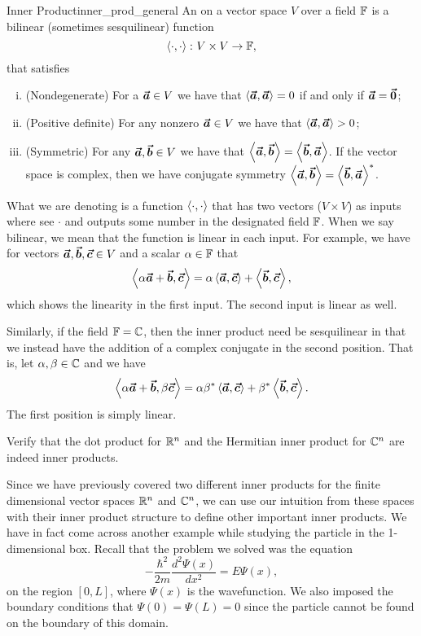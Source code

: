 \begin{df}{Inner Product}{inner_prod_general}
An  on a vector space $V$ over a field $\mathbb{F}$ is a bilinear (sometimes sesquilinear) function
\[
\left\langle \cdot, \cdot \right\rangle \colon V \times V \to \mathbb{F},
\]
that satisfies
\begin{enumerate}[i.]
	\item (Nondegenerate) For a $\boldsymbol{\vec{a}}\in V$ we have that $\left\langle \boldsymbol{\vec{a}}, \boldsymbol{\vec{a}} \right\rangle =0$ if and only if $\boldsymbol{\vec{a}}=\boldsymbol{\vec{0}}$;
	\item (Positive definite) For any nonzero $\boldsymbol{\vec{a}} \in V$ we have that $\left\langle \boldsymbol{\vec{a}}, \boldsymbol{\vec{a}} \right\rangle > 0$;
	\item (Symmetric) For any $\boldsymbol{\vec{a}},\boldsymbol{\vec{b}}\in V$ we have that $\left\langle \boldsymbol{\vec{a}}, \boldsymbol{\vec{b}} \right\rangle = \left\langle \boldsymbol{\vec{b}}, \boldsymbol{\vec{a}} \right\rangle$. If the vector space is complex, then we have conjugate symmetry $\left\langle \boldsymbol{\vec{a}}, \boldsymbol{\vec{b}} \right\rangle=\left\langle \boldsymbol{\vec{b}}, \boldsymbol{\vec{a}} \right\rangle^*$.
\end{enumerate}
What we are denoting is a function $\left\langle \cdot, \cdot \right\rangle$ that has two vectors ($V\times V$) as inputs where see $\cdot$ and outputs some number in the designated field $\mathbb{F}$. When we say bilinear, we mean that the function is linear in each input. For example, we have for vectors $\boldsymbol{\vec{a}},\boldsymbol{\vec{b}},\boldsymbol{\vec{c}}\in V$ and a scalar $\alpha \in \mathbb{F}$ that
\[
\left\langle \alpha\boldsymbol{\vec{a}} + \boldsymbol{\vec{b}}, \boldsymbol{\vec{c}} \right\rangle = \alpha \left\langle \boldsymbol{\vec{a}}, \boldsymbol{\vec{c}} \right\rangle + \left\langle \boldsymbol{\vec{b}}, \boldsymbol{\vec{c}} \right\rangle,
\]
which shows the linearity in the first input.  The second input is linear as well.

Similarly, if the field $\mathbb{F}=\mathbb{C}$, then the inner product need be sesquilinear in that we instead have the addition of a complex conjugate in the second position. That is, let $\alpha,\beta\in \mathbb{C}$ and we have
\[
\left\langle \alpha\boldsymbol{\vec{a}} + \boldsymbol{\vec{b}}, \beta\boldsymbol{\vec{c}} \right\rangle = \alpha \beta^*\left\langle \boldsymbol{\vec{a}}, \boldsymbol{\vec{c}} \right\rangle + \beta^*\left\langle \boldsymbol{\vec{b}}, \boldsymbol{\vec{c}} \right\rangle.
\]
The first position is simply linear.
\end{df}

\begin{exercise}
	Verify that the dot product for $\mathbb{R}^n$ and the Hermitian inner product for $\mathbb{C}^n$ are indeed inner products.
\end{exercise}

Since we have previously covered two different inner products for the finite dimensional vector spaces $\mathbb{R}^n$ and $\mathbb{C}^n$, we can use our intuition from these spaces with their inner product structure to define other important inner products.  We have in fact come across another example while studying the particle in the 1-dimensional box.  Recall that the problem we solved was the equation
\[
-\frac{\hbar^2}{2m} \frac{d^2 \Psi(x)}{dx^2} = E\Psi(x),
\]
on the region $[0,L]$, where $\Psi(x)$ is the wavefunction.  We also imposed the boundary conditions that $\Psi(0)=\Psi(L)=0$ since the particle cannot be found on the boundary of this domain.  


